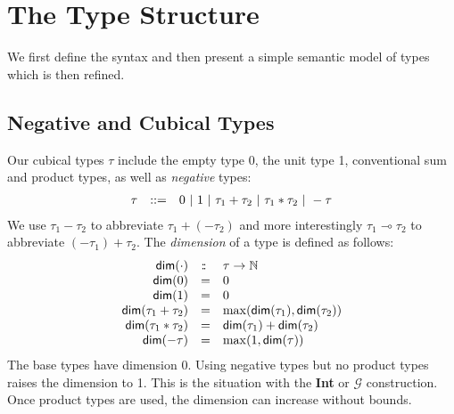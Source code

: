 \documentclass[authoryear,preprint]{sigplanconf}
\newcommand{\bdim}[1]{\textsf{dim}(#1)}
\newcommand{\lolli}{\multimap}
\newcommand{\hast}{:\mkern -2.5mu:\;}
\begin{document}
\section{The Type Structure}

We first define the syntax and then present a simple semantic model of types
which is then refined.

\subsection{Negative and Cubical Types}

Our cubical types $\tau$ include the empty type 0, the unit type 1,
conventional sum and product types, as well as \emph{negative} types:
\[\begin{array}{rcl}
\tau &::=& 0 ~|~ 1 ~|~ \tau_1 + \tau_2 ~|~ \tau_1 * \tau_2 ~|~ - \tau
\end{array}\]
We use $\tau_1 - \tau_2$ to abbreviate $\tau_1 + (- \tau_2)$ and more
interestingly $\tau_1 \lolli \tau_2$ to abbreviate $(- \tau_1) + \tau_2$.
The \emph{dimension} of a type is defined as follows:
\[\begin{array}{rcl}
\bdim{\cdot} &\hast& \tau \rightarrow \mathbb{N} \\
\bdim{0} &=& 0 \\
\bdim{1} &=& 0 \\
\bdim{\tau_1 + \tau_2} &=& \max(\bdim{\tau_1},\bdim{\tau_2}) \\
\bdim{\tau_1 * \tau_2} &=& \bdim{\tau_1} + \bdim{\tau_2} \\
\bdim{- \tau} &=& \max(1,\bdim{\tau})
\end{array}\]
The base types have dimension 0. Using negative types but no product types
raises the dimension to 1. This is the situation with the \textbf{Int} or
$\mathcal{G}$ construction. Once product types are used, the dimension can
increase without bounds.
\end{document}
